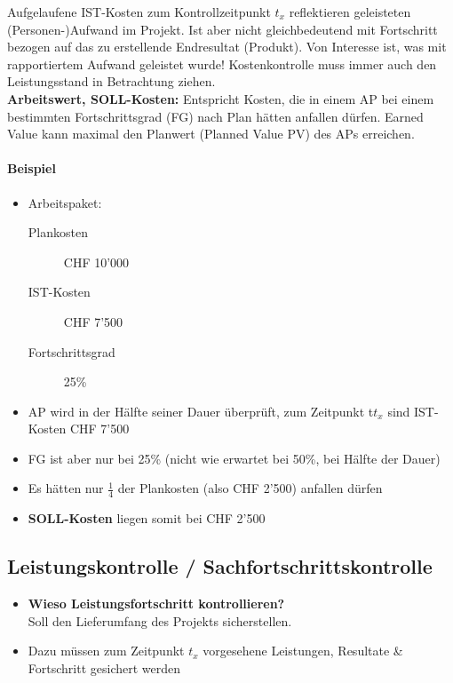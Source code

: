 \documentclass[a4paper]{article}
\begin{document}
		Aufgelaufene IST-Kosten zum Kontrollzeitpunkt $t_x$ reflektieren geleisteten (Personen-)Aufwand im Projekt.
		Ist aber nicht gleichbedeutend mit Fortschritt bezogen auf das zu erstellende Endresultat (Produkt).
		Von Interesse ist, was mit rapportiertem Aufwand geleistet wurde!
		Kostenkontrolle muss immer auch den Leistungsstand in Betrachtung ziehen.\\
		\textbf{Arbeitswert, SOLL-Kosten:} Entspricht Kosten, die in einem AP bei einem bestimmten Fortschrittsgrad (FG) nach Plan hätten anfallen dürfen. 
		Earned Value kann maximal den Planwert (Planned Value PV) des APs erreichen.
			
			\paragraph{Beispiel}
			
			\begin{itemize}
				\item Arbeitspaket:
				\begin{description}
					\item[Plankosten] CHF 10'000
					\item[IST-Kosten] CHF 7'500
					\item[Fortschrittsgrad] 25\%
				\end{description}
				\item AP wird in der Hälfte seiner Dauer überprüft, zum Zeitpunkt t$t_x$ sind IST-Kosten CHF 7'500
				\item FG ist aber nur bei 25\% (nicht wie erwartet bei 50\%, bei Hälfte der Dauer)
				\item Es hätten nur $\frac{1}{4}$ der Plankosten (also CHF 2'500) anfallen dürfen
				\item \textbf{SOLL-Kosten} liegen somit bei CHF 2'500
			\end{itemize}
		
\newpage

	\subsection{Leistungskontrolle / Sachfortschrittskontrolle}
	
	\begin{itemize}
		\item \textbf{Wieso Leistungsfortschritt kontrollieren?}\\
			Soll den Lieferumfang des Projekts sicherstellen.
		\item Dazu müssen zum Zeitpunkt $t_x$ vorgesehene Leistungen, Resultate \& Fortschritt gesichert werden
	\end{itemize}
\end{document}
